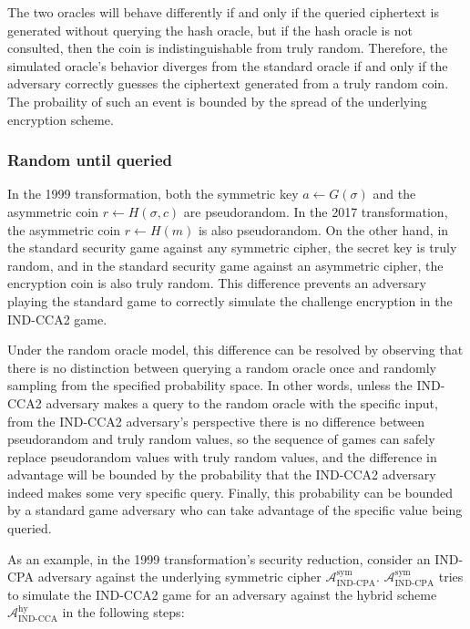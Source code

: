 \documentclass{article}
\begin{document}
The two oracles will behave differently if and only if the queried ciphertext is generated without querying the hash oracle, but if the hash oracle is not consulted, then the coin is indistinguishable from truly random. Therefore, the simulated oracle's behavior diverges from the standard oracle if and only if the adversary correctly guesses the ciphertext generated from a truly random coin. The probaility of such an event is bounded by the spread of the underlying encryption scheme.

\subsubsection{Random until queried}\label{random-until-queried}
In the 1999 transformation, both the symmetric key $a \leftarrow G(\sigma)$ and the asymmetric coin $r \leftarrow H(\sigma, c)$ are pseudorandom. In the 2017 transformation, the asymmetric coin $r \leftarrow H(m)$ is also pseudorandom. On the other hand, in the standard security game against any symmetric cipher, the secret key is truly random, and in the standard security game against an asymmetric cipher, the encryption coin is also truly random. This difference prevents an adversary playing the standard game to correctly simulate the challenge encryption in the IND-CCA2 game.

Under the random oracle model, this difference can be resolved by observing that there is no distinction between querying a random oracle once and randomly sampling from the specified probability space. In other words, unless the IND-CCA2 adversary makes a query to the random oracle with the specific input, from the IND-CCA2 adversary's perspective there is no difference between pseudorandom and truly random values, so the sequence of games can safely replace pseudorandom values with truly random values, and the difference in advantage will be bounded by the probability that the IND-CCA2 adversary indeed makes some very specific query. Finally, this probability can be bounded by a standard game adversary who can take advantage of the specific value being queried.

As an example, in the 1999 transformation's security reduction, consider an IND-CPA adversary against the underlying symmetric cipher $\mathcal{A}^\text{sym}_\text{IND-CPA}$. $\mathcal{A}^\text{sym}_\text{IND-CPA}$ tries to simulate the IND-CCA2 game for an adversary against the hybrid scheme $\mathcal{A}^\text{hy}_\text{IND-CCA}$ in the following steps:
\end{document}
